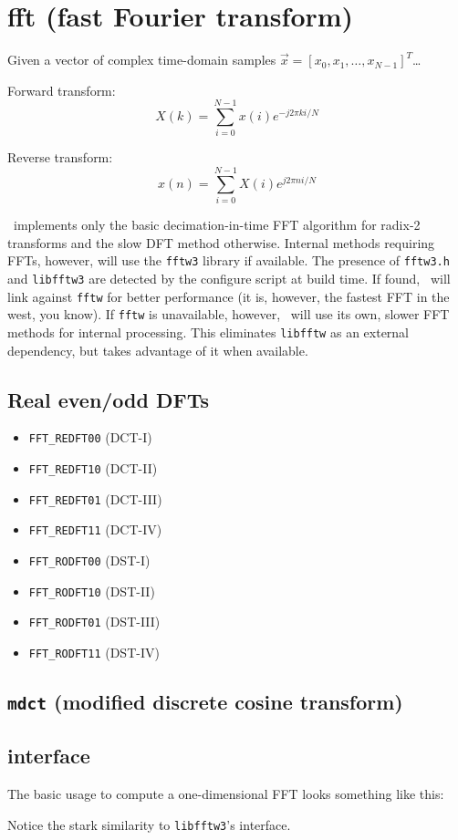 % 
%

\newpage
\section{fft (fast Fourier transform)}
\label{module:fft}

Given a vector of complex time-domain samples
$\vec{x} = \left[x_0,x_1,\ldots,x_{N-1}\right]^T$\ldots

Forward transform:
\[
    X(k) = \sum_{i=0}^{N-1}{x(i) e^{-j 2 \pi k i/N}}
\]

Reverse transform:
\[
    x(n) = \sum_{i=0}^{N-1}{X(i) e^{ j 2 \pi n i/N}}
\]

\liquid\ implements only the basic decimation-in-time FFT algorithm for
radix-2 transforms and the slow DFT method otherwise.
Internal methods requiring FFTs, however, will use the {\tt fftw3} library
\cite{fftw:web} if available.
The presence of {\tt fftw3.h} and {\tt libfftw3} are detected by the configure
script at build time.
If found, \liquid\ will link against {\tt fftw} for better performance (it is,
however, the fastest FFT in the west, you know).
If {\tt fftw} is unavailable, however, \liquid\ will use its own, slower FFT
methods for internal processing.
This eliminates {\tt libfftw} as an external dependency, but takes advantage
of it when available.

\subsection{Real even/odd DFTs}
\label{module:fft:r2r}

\begin{itemize}
\item {\tt FFT\_REDFT00} (DCT-I)
\item {\tt FFT\_REDFT10} (DCT-II)
\item {\tt FFT\_REDFT01} (DCT-III)
\item {\tt FFT\_REDFT11} (DCT-IV)

\item {\tt FFT\_RODFT00} (DST-I)
\item {\tt FFT\_RODFT10} (DST-II)
\item {\tt FFT\_RODFT01} (DST-III)
\item {\tt FFT\_RODFT11} (DST-IV)
\end{itemize}

\subsection{{\tt mdct} (modified discrete cosine transform)}
\label{module:fft:mdct}

\subsection{interface}
The basic usage to compute a one-dimensional FFT looks something like this:
%

%
Notice the stark similarity to {\tt libfftw3}'s interface.

